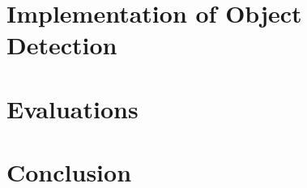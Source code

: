\part{Implementation of Object Detection}




\part{Evaluations} %

 


\part{Conclusion}






\appendix                       %






\listoftables
\listoffigures
\lstlistoflistings
\nocite{*} %



